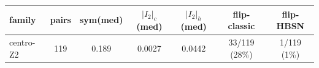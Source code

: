 \begin{tabular}{|l|c|c|c|c|c|c|}\hline
family & pairs & sym(med) & $|I_2|_c$(med) & $|I_2|_h$(med) & flip-classic & flip-HBSN \\ \hline
centro-Z2 & 119 & 0.189 & 0.0027 & 0.0442 & 33/119 (28\%) & 1/119 (1\%) \\ \hline
\end{tabular}
